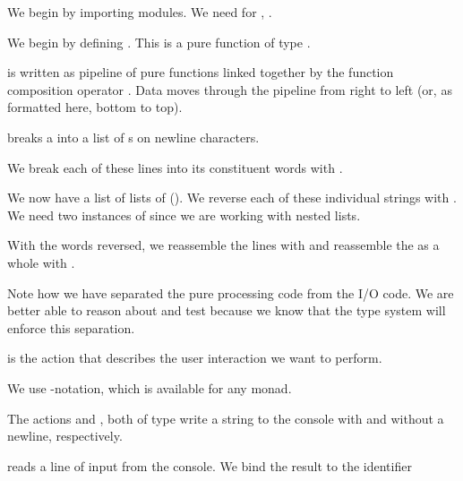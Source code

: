 \begin{notelist}
    \item We begin by importing modules. We need  for \code{(<\$>)}, 
          .
    \item We begin by defining . This is a pure function of type .
        \begin{notelist}
            \item {} is written as pipeline of pure functions linked together by the function composition
                  operator . Data moves through the pipeline from right to left (or, as formatted here,
                  bottom to top).
            \item {} breaks a  into a list of s on newline characters.
            \item We break each of these lines into its constituent words with .
            \item We now have a list of lists of  (\code{[[String]]}). We reverse each of these
                  individual strings with . We need two instances of  since we are
                  working with nested lists.
            \item With the words reversed, we reassemble the lines with  and reassemble the
                   as a whole with . 
        \end{notelist}
    \item Note how we have separated the pure processing code from the I/O code. We are better able to reason about
          and test  because we know that the type system will enforce this separation.
    \item {} is the  action that describes the user interaction we want to perform.
        \begin{notelist}
            \item We use -notation, which is available for any monad.
            \item The  actions  and , both of type 
                  write a string to the console with and without a newline, respectively.
            \item {} reads a line of input from the console. We bind the result to the identifier

\end{notelist}
\end{notelist}
